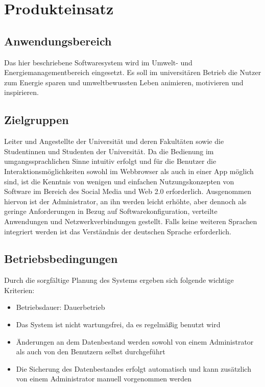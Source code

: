 \section{Produkteinsatz}
\subsection{Anwendungsbereich}
Das hier beschriebene Softwaresystem wird im Umwelt- und Energiemanagementbereich eingesetzt. Es soll im universitären Betrieb die Nutzer  zum Energie sparen und umweltbewussten Leben animieren, motivieren und inspirieren. 
\subsection{Zielgruppen}
Leiter und Angestellte der Universität und deren Fakultäten sowie die Studentinnen und Studenten der Universität. 
Da die Bedienung im umgangssprachlichen Sinne intuitiv erfolgt und für die Benutzer die Interaktionsmöglichkeiten sowohl im Webbrowser als auch in einer App möglich sind, ist die Kenntnis von wenigen und einfachen Nutzungskonzepten von Software im Bereich des Social Media und Web 2.0 erforderlich. Ausgenommen hiervon ist der Administrator, an ihn werden leicht erhöhte, aber dennoch als geringe Anforderungen in Bezug auf Softwarekonfiguration, verteilte Anwendungen und Netzwerkverbindungen gestellt. 
Falls keine weiteren Sprachen integriert werden ist das Verständnis der deutschen Sprache erforderlich. 
\subsection{Betriebsbedingungen}
Durch die sorgfältige Planung des Systems ergeben sich folgende wichtige Kriterien: 
\begin{itemize}
\item Betriebsdauer: Dauerbetrieb 
\item Das System ist nicht wartungsfrei, da es regelmäßig benutzt wird 
\item Änderungen an dem Datenbestand werden sowohl von einem Administrator als auch von den Benutzern selbst durchgeführt 
\item Die Sicherung des Datenbestandes erfolgt automatisch und kann zusätzlich von einem Administrator manuell vorgenommen werden
\end{itemize}